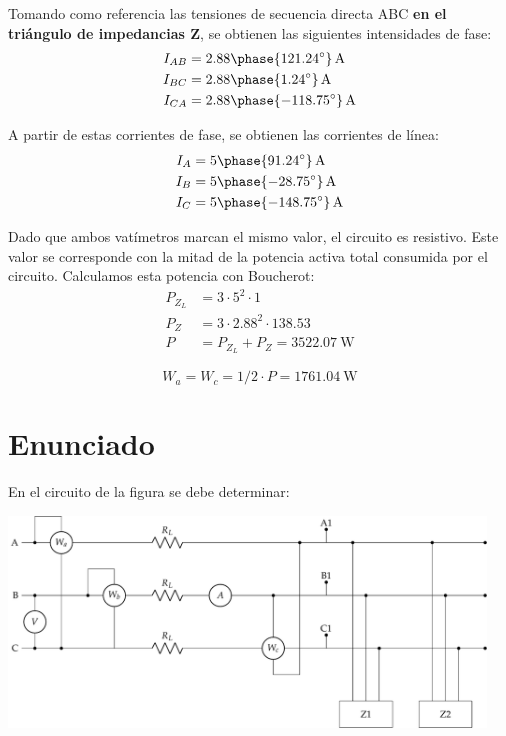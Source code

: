 Tomando como referencia las tensiones de secuencia directa ABC
\textbf{en el triángulo de impedancias Z}, se obtienen las siguientes
intensidades de fase:
\begin{align*}
  I_{AB} &= {2.88\phase{121.24^\circ}}\,\unit{\ampere}\\
  I_{BC} &= {2.88\phase{1.24^\circ}}\,\unit{\ampere}\\
  I_{CA} &= {2.88\phase{-118.75^\circ}}\,\unit{\ampere}\\
\end{align*}

A partir de estas corrientes de fase, se obtienen las corrientes de línea:
\begin{align*}
  I_{A} &= {5\phase{91.24^\circ}}\,\unit{\ampere}\\
  I_{B} &= {5\phase{-28.75^\circ}}\,\unit{\ampere}\\
  I_{C} &= {5\phase{-148.75^\circ}}\,\unit{\ampere}
\end{align*}



Dado que ambos vatímetros marcan el mismo valor, el circuito es
resistivo. Este valor se corresponde con la mitad de la potencia
activa total consumida por el circuito. Calculamos esta potencia con Boucherot:
\begin{align*}
  P_{Z_L} &= 3 \cdot 5^2 \cdot 1\\
  P_Z &= 3 \cdot 2.88^2 \cdot 138.53\\
  P &= P_{Z_L} + P_{Z} = \SI{3522.07}{\watt}
\end{align*}

\[
  W_a = W_c = 1/2 \cdot P = \SI{1761.04}{\watt}
\]



\section{Enunciado}

En el circuito de la figura se debe determinar:

\begin{center}
  \includegraphics[width=0.95\textwidth]{figuras/BT3_11.pdf}
\end{center}

